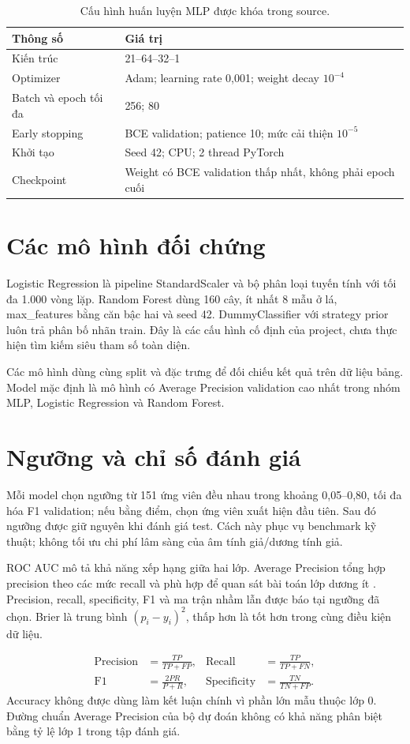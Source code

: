 \begin{table}[H]\centering\small
\caption{Cấu hình huấn luyện MLP được khóa trong source.}
\begin{tabular}{@{}ll@{}}\toprule
Thông số & Giá trị \\\midrule
Kiến trúc & 21--64--32--1 \\
Optimizer & Adam; learning rate 0,001; weight decay $10^{-4}$ \\
Batch và epoch tối đa & 256; 80 \\
Early stopping & BCE validation; patience 10; mức cải thiện $10^{-5}$ \\
Khởi tạo & Seed 42; CPU; 2 thread PyTorch \\
Checkpoint & Weight có BCE validation thấp nhất, không phải epoch cuối \\\bottomrule
\end{tabular}
\end{table}

\section{Các mô hình đối chứng}
Logistic Regression là pipeline StandardScaler và bộ phân loại tuyến tính với tối đa 1.000 vòng lặp. Random Forest dùng 160 cây, ít nhất 8 mẫu ở lá, max\_features bằng căn bậc hai và seed 42. DummyClassifier với strategy prior luôn trả phân bố nhãn train. Đây là các cấu hình cố định của project, chưa thực hiện tìm kiếm siêu tham số toàn diện.

Các mô hình dùng cùng split và đặc trưng để đối chiếu kết quả trên dữ liệu bảng. Model mặc định là mô hình có Average Precision validation cao nhất trong nhóm MLP, Logistic Regression và Random Forest.

\section{Ngưỡng và chỉ số đánh giá}
Mỗi model chọn ngưỡng từ 151 ứng viên đều nhau trong khoảng 0,05--0,80, tối đa hóa F1 validation; nếu bằng điểm, chọn ứng viên xuất hiện đầu tiên. Sau đó ngưỡng được giữ nguyên khi đánh giá test. Cách này phục vụ benchmark kỹ thuật; không tối ưu chi phí lâm sàng của âm tính giả/dương tính giả.

ROC AUC mô tả khả năng xếp hạng giữa hai lớp. Average Precision tổng hợp precision theo các mức recall và phù hợp để quan sát bài toán lớp dương ít \cite{sklearn_ap}. Precision, recall, specificity, F1 và ma trận nhầm lẫn được báo tại ngưỡng đã chọn. Brier là trung bình $(p_i-y_i)^2$, thấp hơn là tốt hơn trong cùng điều kiện dữ liệu.

\begin{align}
\operatorname{Precision}&=\frac{TP}{TP+FP}, &\operatorname{Recall}&=\frac{TP}{TP+FN},\\
\operatorname{F1}&=\frac{2PR}{P+R}, &\operatorname{Specificity}&=\frac{TN}{TN+FP}.
\end{align}
Accuracy không được dùng làm kết luận chính vì phần lớn mẫu thuộc lớp 0. Đường chuẩn Average Precision của bộ dự đoán không có khả năng phân biệt bằng tỷ lệ lớp 1 trong tập đánh giá.
